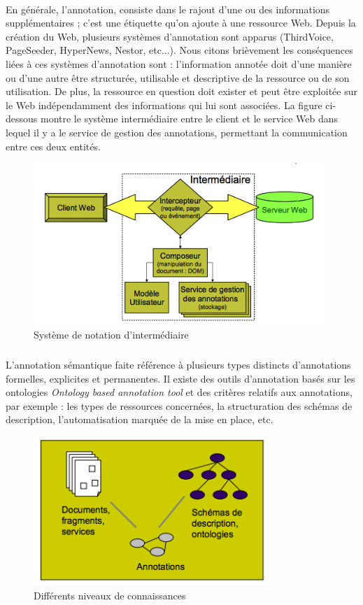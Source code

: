 \paragraph{}
En générale, l'annotation, consiste dans le rajout d'une ou des informations supplémentaires ; c'est une étiquette qu'on ajoute à une ressource Web. Depuis la création du Web, plusieurs systèmes d'annotation sont apparus (ThirdVoice, PageSeeder, HyperNews, Nestor, etc...).
Nous citons brièvement les conséquences liées à ces systèmes d'annotation sont : l'information annotée doit d'une manière ou d'une autre être structurée, utilisable et descriptive de la ressource ou de son utilisation. De plus, la ressource en question doit exister et peut être exploitée sur le Web indépendamment des informations qui lui sont associées. La figure ci-dessous montre le système intermédiaire entre le client et le service Web dans lequel il y a le service de gestion des annotations, permettant la communication entre ces deux entités.
\begin{figure}[H]
\centering
\includegraphics[width=11cm]{AnnotationSys.png}
\caption{Système de notation d'intermédiaire}
\end{figure}
\subparagraph{}
L'annotation sémantique faite référence à plusieurs types distincts d'annotations formelles, explicites et permanentes. Il existe des outils d'annotation basés sur les ontologies {\it Ontology based annotation tool}
et des critères relatifs aux annotations, par exemple : les types de ressources concernées, la structuration des schémas de description, l'automatisation marquée de la mise en place, etc.
\begin{figure}[H]
\centering
\includegraphics[width=9cm]{diffConnaissances.png}
\caption{Différents niveaux de connaissances}
\end{figure}
